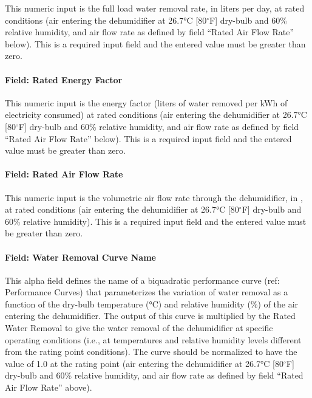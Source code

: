 This numeric input is the full load water removal rate, in liters per day, at rated conditions (air entering the dehumidifier at 26.7\si{\degreeCelsius} {[}80$^\circ$F{]} dry-bulb and 60\% relative humidity, and air flow rate as defined by field ``Rated Air Flow Rate'' below). This is a required input field and the entered value must be greater than zero.

\paragraph{Field: Rated Energy Factor}\label{field-rated-energy-factor}

This numeric input is the energy factor (liters of water removed per kWh of electricity consumed) at rated conditions (air entering the dehumidifier at 26.7\si{\degreeCelsius} {[}80$^\circ$F{]} dry-bulb and 60\% relative humidity, and air flow rate as defined by field ``Rated Air Flow Rate'' below). This is a required input field and the entered value must be greater than zero.

\paragraph{Field: Rated Air Flow Rate}\label{field-rated-air-flow-rate-001}

This numeric input is the volumetric air flow rate through the dehumidifier, in \si{\volumeFlowRate}, at rated conditions (air entering the dehumidifier at 26.7\si{\degreeCelsius} {[}80$^\circ$F{]} dry-bulb and 60\% relative humidity). This is a required input field and the entered value must be greater than zero.

\paragraph{Field: Water Removal Curve Name}\label{field-water-removal-curve-name}

This alpha field defines the name of a biquadratic performance curve (ref: Performance Curves) that parameterizes the variation of water removal as a function of the dry-bulb temperature (\si{\degreeCelsius}) and relative humidity (\%) of the air entering the dehumidifier. The output of this curve is multiplied by the Rated Water Removal to give the water removal of the dehumidifier at specific operating conditions (i.e., at temperatures and relative humidity levels different from the rating point conditions). The curve should be normalized to have the value of 1.0 at the rating point (air entering the dehumidifier at 26.7\si{\degreeCelsius} {[}80$^\circ$F{]} dry-bulb and 60\% relative humidity, and air flow rate as defined by field ``Rated Air Flow Rate'' above).

